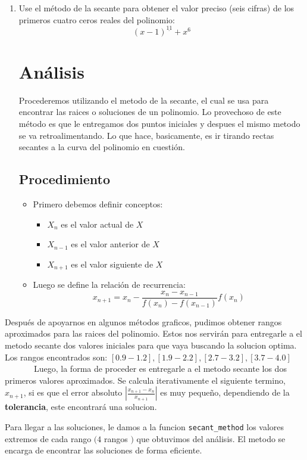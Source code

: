 \documentclass[spanish, fleqn]{article}
\begin{document}
\begin{enumerate}
            
       \newpage
  \item %
    Use el método de la secante
    para obtener el valor preciso
    (seis cifras)
    de los primeros cuatro ceros reales
    del polinomio:
    \begin{equation*}
      (x - 1)^{\underline{11}} + x^6
    \end{equation*}
   \section*{An\'alisis}
   			Procederemos utilizando el metodo de la secante, el cual se usa para encontrar las raices o soluciones de un polinomio. Lo provechoso de este m\'etodo es que le entregamos dos puntos iniciales y despues el mismo metodo se va retroalimentando. Lo que hace, basicamente, es ir tirando rectas secantes a la curva del polinomio en cuesti\'on.
            \subsection*{Procedimiento}
            \begin{itemize}
            \item Primero debemos definir conceptos:
            \begin{itemize}
            \item $X_{n}$ es el valor actual de $X$
            \item $X_{n-1}$ es el valor anterior de $X$
            \item $X_{n+1}$ es el valor siguiente de $X$
            \end{itemize}
            \item Luego se define la relaci\'on de recurrencia:
            \begin{equation*}
            		x_{n+1} = x_{n} - \frac{x_{n} - x_{n-1}}{f(x_{n}) - f(x_{n-1})} f(x_{n})
            \end{equation*}
            \end{itemize}
           
  \end{enumerate}
            Despu\'es de apoyarnos en algunos m\'etodos graficos, pudimos obtener rangos aproximados para las raices del polinomio. Estos nos servir\'an para entregarle a el metodo secante dos valores iniciales para que vaya buscando la solucion optima.\\
            Los rangos encontrados son: $[0.9-1.2],[1.9-2.2],[2.7-3.2],[3.7-4.0]$ \\
            \ \ \ \ \ \ \ Luego, la forma de proceder es entregarle a el metodo secante los dos primeros valores aproximados. Se calcula iterativamente el siguiente termino, $x_{n+1}$, si es que el error absoluto $| \frac{ x_{n+1} - x_{n}}{x_{n+1}} |$ es muy pequeño, dependiendo de la \textbf{tolerancia}, este encontrar\'a una solucion.
            
    Para llegar a las soluciones, le damos a la funcion \texttt{secant\_method} los valores extremos de cada rango $(4$ rangos $)$ que obtuvimos del an\'alisis. El metodo se encarga de encontrar las soluciones de forma eficiente. 
\end{document}
